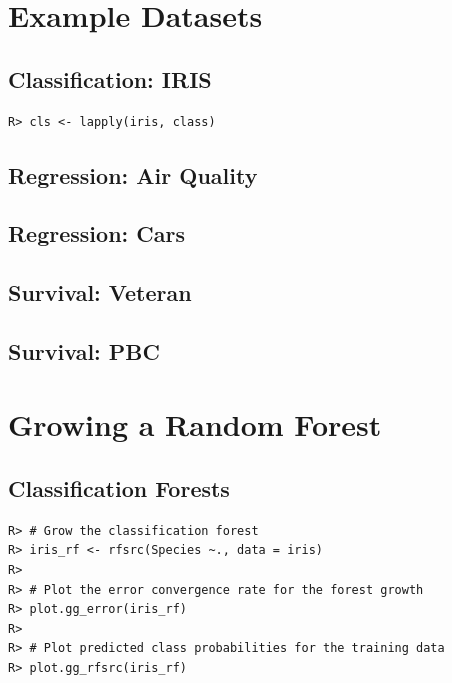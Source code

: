 \documentclass[nojss]{jss}\usepackage[]{graphicx}\usepackage[]{color}
\makeatletter
\newenvironment{kframe}{%
 \def\at@end@of@kframe{}%
 \ifinner\ifhmode%
  \def\at@end@of@kframe{\end{minipage}}%
  \begin{minipage}{\columnwidth}%
 \fi\fi%
 \def\FrameCommand##1{\hskip\@totalleftmargin \hskip-\fboxsep
 \colorbox{shadecolor}{##1}\hskip-\fboxsep
     \hskip-\linewidth \hskip-\@totalleftmargin \hskip\columnwidth}%
 \MakeFramed {\advance\hsize-\width
   \@totalleftmargin\z@ \linewidth\hsize
   \@setminipage}}%
 {\par\unskip\endMakeFramed%
 \at@end@of@kframe}
\newenvironment{knitrout}{}{} %
\makeatother
\begin{document}
\section{Example Datasets}
\subsection{Classification: IRIS}
\begin{knitrout}\footnotesize
{}\color{fgcolor}\begin{kframe}
\begin{verbatim}
R> cls <- lapply(iris, class)
\end{verbatim}
\end{kframe}
\end{knitrout}
\subsection{Regression: Air Quality}

\subsection{Regression: Cars}

\subsection{Survival: Veteran}

\subsection{Survival: PBC}

\section{Growing a Random Forest}

\subsection{Classification Forests}
\begin{knitrout}\footnotesize
{}\color{fgcolor}\begin{kframe}
\begin{verbatim}
R> # Grow the classification forest
R> iris_rf <- rfsrc(Species ~., data = iris)
R> 
R> # Plot the error convergence rate for the forest growth
R> plot.gg_error(iris_rf)
R> 
R> # Plot predicted class probabilities for the training data
R> plot.gg_rfsrc(iris_rf)
\end{verbatim}
\end{kframe}
\end{knitrout}
\end{document}

